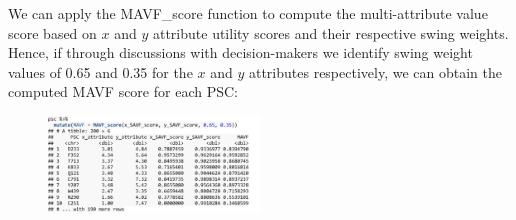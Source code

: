 \documentclass[twocolumn]{svjour3}       %
\begin{document}
We can apply the MAVF\_score function to compute the multi-attribute value score based on $x$ and $y$ attribute utility scores and their respective swing weights. Hence, if through discussions with decision-makers we identify swing weight values of 0.65 and 0.35 for the $x$ and $y$ attributes respectively, we can obtain the computed MAVF score for each PSC:

\begin{figure}[!htb]
  \includegraphics[width=0.5\textwidth]{code11.png}
\end{figure}
\end{document}
